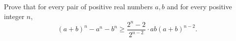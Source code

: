 Prove that for every pair of positive real numbers $a, b$ and for every positive integer $n$,
$$(a+b)^n-a^n-b^n \ge \frac{2^n-2}{2^{n-2}} \cdot ab(a+b)^{n-2}.$$
